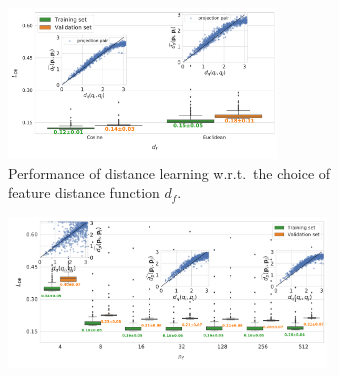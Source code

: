 \begin{figure}[ht]
    \centering
    \begin{subfigure}[t]{0.46\linewidth}
        \centering
        \includegraphics[height=4cm]{figures/dPdQ_feat_distances.pdf}
        \caption{%
            Performance of distance learning w.r.t.\ the choice of feature distance function $d_f$.
        }\label{fig:geo-eucl-mlp}
    \end{subfigure}
    \hfill
    \begin{subfigure}[t]{0.52\linewidth}
        \centering
        \includegraphics[height=4cm]{figures/de_nf.pdf}

\end{subfigure}
\end{figure}

